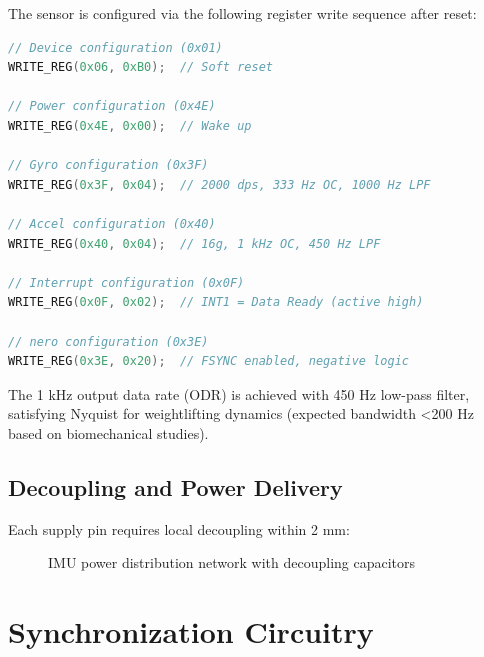 The sensor is configured via the following register write sequence after reset:

\begin{lstlisting}[caption={ICM-42688-P initialization sequence}, language=c]
// Device configuration (0x01)
WRITE_REG(0x06, 0xB0);  // Soft reset

// Power configuration (0x4E)
WRITE_REG(0x4E, 0x00);  // Wake up

// Gyro configuration (0x3F)
WRITE_REG(0x3F, 0x04);  // 2000 dps, 333 Hz OC, 1000 Hz LPF

// Accel configuration (0x40)
WRITE_REG(0x40, 0x04);  // 16g, 1 kHz OC, 450 Hz LPF

// Interrupt configuration (0x0F)
WRITE_REG(0x0F, 0x02);  // INT1 = Data Ready (active high)

// nero configuration (0x3E)
WRITE_REG(0x3E, 0x20);  // FSYNC enabled, negative logic
\end{lstlisting}

The 1 kHz output data rate (ODR) is achieved with 450 Hz low-pass filter, satisfying Nyquist for weightlifting dynamics (expected bandwidth <200 Hz based on biomechanical studies).

\subsection{Decoupling and Power Delivery}

Each supply pin requires local decoupling within 2 mm:

\begin{figure}[h]
    \centering
    \caption{IMU power distribution network with decoupling capacitors}
    \label{fig:imu_power}
\end{figure}

\section{Synchronization Circuitry}

